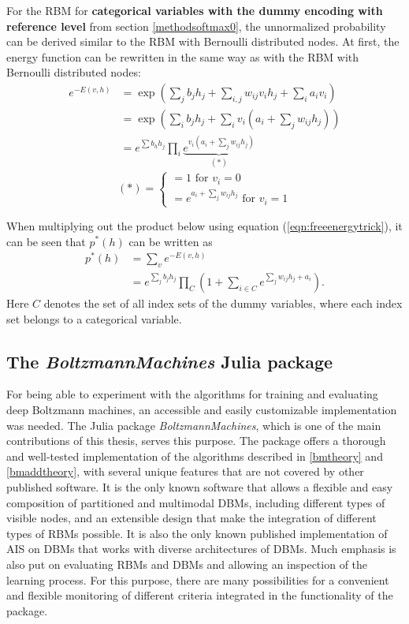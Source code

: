 \documentclass[12pt]{article}
\newcommand{\apkg}[1]{\emph{#1}}
\begin{document}
For the RBM for {\bf categorical variables with the dummy encoding with reference level} from section \ref{methodsoftmax0}, the unnormalized probability can be derived similar to the RBM with Bernoulli distributed nodes. At first, the energy function can be rewritten in the same way as with the RBM with Bernoulli distributed nodes:
\begin{align}
e^{-E(v,h)} &= \exp \left(\sum_j b_j h_j + \sum_{i,j} w_{ij} v_i h_j + \sum_i a_i v_i \right) \nonumber \\
&= \exp \left( \sum_i b_j h_j + \sum_i v_i \left( a_i + \sum_j w_{ij} h_j \right) \right) \nonumber \\
&= e^{\sum b_h h_j} \prod_i \underbrace{e^{v_i (a_i + \sum_j w_{ij} h_j)}}_{(*)}
\label{eqn:freeenergytrick}
\end{align}
\begin{equation*}
(*) = \left\{
\begin{array}{l}
 =1 \text{ for } v_i = 0 \\
 = e^{a_i +\sum_j w_{ij} h_j} \text{ for } v_i = 1 
\end{array} \right.
\end{equation*}

When multiplying out the product below using equation (\ref{eqn:freeenergytrick}), it can be seen that $p^*(h)$ can be written as
\begin{align*}
p^*(h) &= \sum_v e^{-E(v,h)} \\
&= e^{\sum_j b_j h_j} \prod_{C} \left( 1 + \sum_{i \in C} e^{\sum_j w_{ij} h_j + a_i} \right).
\end{align*}
Here $C$ denotes the set of all index sets of the dummy variables, where each index set belongs to a categorical variable.

\subsection{The \apkg{BoltzmannMachines} Julia package}
For being able to experiment with the algorithms for training and evaluating deep Boltzmann machines, an accessible and easily customizable implementation was needed.
The Julia package \apkg{BoltzmannMachines}, which is one of the main contributions of this thesis, serves this purpose.
The package offers a thorough and well-tested implementation of the algorithms described in \ref{bmtheory} and \ref{bmaddtheory}, with several unique features that are not covered by other published software.
It is the only known software that allows a flexible and easy composition of partitioned and multimodal DBMs, including different types of visible nodes, and an extensible design that make the integration of different types of RBMs possible.
It is also the only known published implementation of AIS on DBMs that works with diverse architectures of DBMs.
Much emphasis is also put on evaluating RBMs and DBMs and allowing an inspection of the learning process.
For this purpose, there are many possibilities for a convenient and flexible monitoring of different criteria integrated in the functionality of the package.
\end{document}
